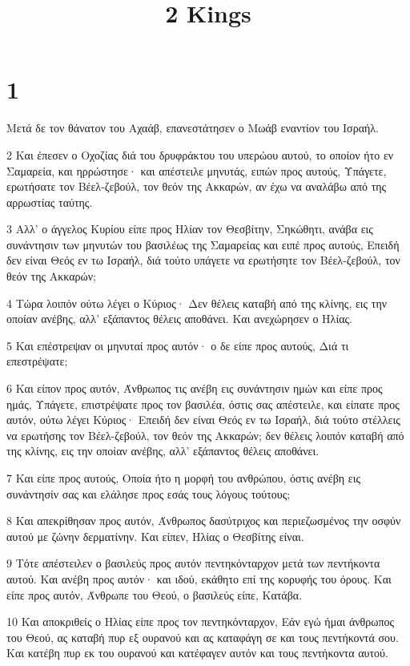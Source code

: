 

\title{2 Kings}


\chapter{1}

\par Μετά δε τον θάνατον του Αχαάβ, επανεστάτησεν ο Μωάβ εναντίον του Ισραήλ.
\par 2 Και έπεσεν ο Οχοζίας διά του δρυφράκτου του υπερώου αυτού, το οποίον ήτο εν Σαμαρεία, και ηρρώστησε· και απέστειλε μηνυτάς, ειπών προς αυτούς, Υπάγετε, ερωτήσατε τον Βέελ-ζεβούλ, τον θεόν της Ακκαρών, αν έχω να αναλάβω από της αρρωστίας ταύτης.
\par 3 Αλλ' ο άγγελος Κυρίου είπε προς Ηλίαν τον Θεσβίτην, Σηκώθητι, ανάβα εις συνάντησιν των μηνυτών του βασιλέως της Σαμαρείας και ειπέ προς αυτούς, Επειδή δεν είναι Θεός εν τω Ισραήλ, διά τούτο υπάγετε να ερωτήσητε τον Βέελ-ζεβούλ, τον θεόν της Ακκαρών;
\par 4 Τώρα λοιπόν ούτω λέγει ο Κύριος· Δεν θέλεις καταβή από της κλίνης, εις την οποίαν ανέβης, αλλ' εξάπαντος θέλεις αποθάνει. Και ανεχώρησεν ο Ηλίας.
\par 5 Και επέστρεψαν οι μηνυταί προς αυτόν· ο δε είπε προς αυτούς, Διά τι επεστρέψατε;
\par 6 Και είπον προς αυτόν, Άνθρωπος τις ανέβη εις συνάντησιν ημών και είπε προς ημάς, Υπάγετε, επιστρέψατε προς τον βασιλέα, όστις σας απέστειλε, και είπατε προς αυτόν, ούτω λέγει Κύριος· Επειδή δεν είναι Θεός εν τω Ισραήλ, διά τούτο στέλλεις να ερωτήσης τον Βέελ-ζεβούλ, τον θεόν της Ακκαρών; δεν θέλεις λοιπόν καταβή από της κλίνης, εις την οποίαν ανέβης, αλλ' εξάπαντος θέλεις αποθάνει.
\par 7 Και είπε προς αυτούς, Οποία ήτο η μορφή του ανθρώπου, όστις ανέβη εις συνάντησίν σας και ελάλησε προς εσάς τους λόγους τούτους;
\par 8 Και απεκρίθησαν προς αυτόν, Άνθρωπος δασύτριχος και περιεζωσμένος την οσφύν αυτού με ζώνην δερματίνην. Και είπεν, Ηλίας ο Θεσβίτης είναι.
\par 9 Τότε απέστειλεν ο βασιλεύς προς αυτόν πεντηκόνταρχον μετά των πεντήκοντα αυτού. Και ανέβη προς αυτόν· και ιδού, εκάθητο επί της κορυφής του όρους. Και είπε προς αυτόν, Άνθρωπε του Θεού, ο βασιλεύς είπε, Κατάβα.
\par 10 Και αποκριθείς ο Ηλίας είπε προς τον πεντηκόνταρχον, Εάν εγώ ήμαι άνθρωπος του Θεού, ας καταβή πυρ εξ ουρανού και ας καταφάγη σε και τους πεντήκοντά σου. Και κατέβη πυρ εκ του ουρανού και κατέφαγεν αυτόν και τους πεντήκοντα αυτού.
